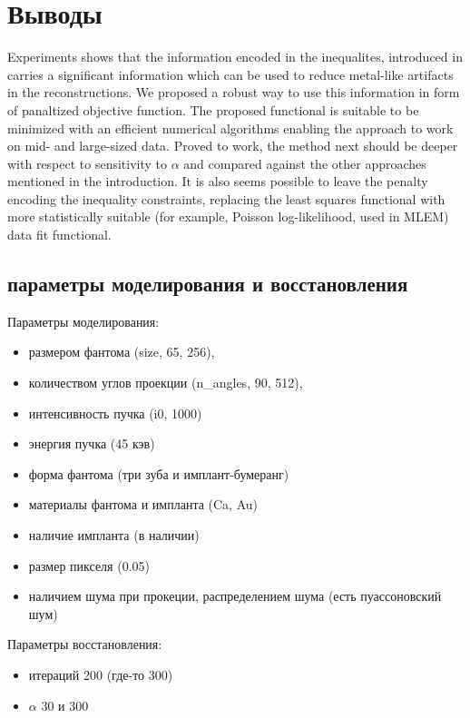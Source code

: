 \section{Выводы}
\label{s-conclusion}

Experiments shows that the information encoded in the inequalites, introduced in \cite{chukalinaway} carries a significant information which can be used to reduce metal-like artifacts in the reconstructions. We proposed a robust way to use this information in form of panaltized objective function. The proposed functional is suitable to be minimized with an efficient numerical algorithms enabling the approach to work on mid- and large-sized data. Proved to work, the method next should be deeper with respect to sensitivity to $\alpha$ and compared against the other approaches mentioned in the introduction. It is also seems possible to leave the penalty encoding the inequality constraints, replacing the least squares functional with more statistically suitable (for example, Poisson log-likelihood, used in MLEM) data fit functional.

\subsection{параметры моделирования и восстановления} \label{sect_2_3}
Параметры моделирования:
\begin{itemize}
  \item размером фантома (size, 65, 256),
  \item количеством углов проекции (n\_angles, 90, 512), 
  \item интенсивность пучка (i0, 1000)
  \item энергия пучка (45 кэв)
  \item форма фантома (три зуба и имплант-бумеранг)
  \item материалы фантома и импланта (Ca, Au)
  \item наличие импланта (в наличии)
  \item размер пикселя (0.05)
  \item наличием шума при прокеции, распределением шума (есть пуассоновский шум)
\end{itemize}

Параметры восстановления:
\begin{itemize}
  \item итераций 200 (где-то 300)
  \item $\alpha$ 30 и 300
\end{itemize}